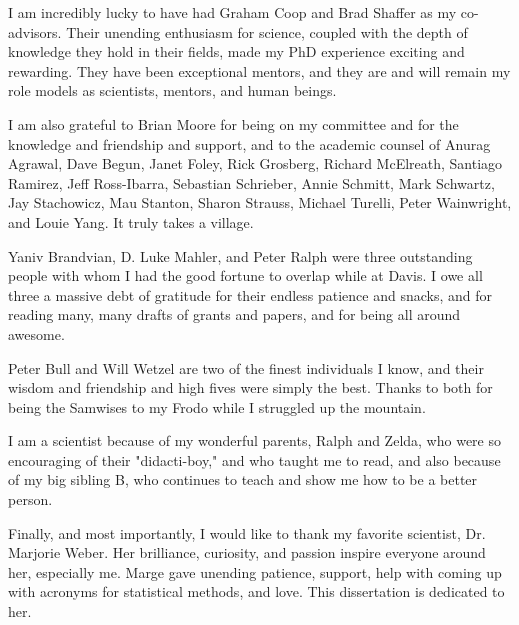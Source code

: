 \begin{frontmatter}
\begin{acknowledgments}
\par I am incredibly lucky to have had Graham Coop and Brad Shaffer as my co-advisors.  Their unending enthusiasm for science, coupled with the depth of knowledge they hold in their fields, made my PhD experience exciting and rewarding.  They have been exceptional mentors, and they are and will remain my role models as scientists, mentors, and human beings.
\par I am also grateful to Brian Moore for being on my committee and for the knowledge and friendship and support, and to the academic counsel of Anurag Agrawal, Dave Begun, Janet Foley, Rick Grosberg, Richard McElreath, Santiago Ramirez, Jeff Ross-Ibarra, Sebastian Schrieber, Annie Schmitt, Mark Schwartz, Jay Stachowicz, Mau Stanton, Sharon Strauss, Michael Turelli, Peter Wainwright, and Louie Yang.  It truly takes a village.
\par Yaniv Brandvian, D. Luke Mahler, and Peter Ralph were three outstanding people with whom I had the good fortune to overlap while at Davis.  I  owe all three a massive debt of gratitude for their endless patience and snacks, and for reading many, many drafts of grants and papers, and for being all around awesome.
\par Peter Bull and Will Wetzel are two of the finest individuals I know, and their wisdom and friendship and high fives were simply the best.  Thanks to both for being the Samwises to my Frodo while I struggled up the mountain.
\par I am a scientist because of my wonderful parents, Ralph and Zelda, who were so encouraging of their "didacti-boy," and who taught me to read, and also because of my big sibling B, who continues to teach and show me how to be a better person.
\par Finally, and most importantly, I would like to thank my favorite scientist, Dr. Marjorie Weber.  Her brilliance, curiosity, and passion inspire everyone around her, especially me.  Marge gave unending patience, support, help with coming up with acronyms for statistical methods, and love.   This dissertation is dedicated to her.

\end{acknowledgments}

%


\end{frontmatter}
